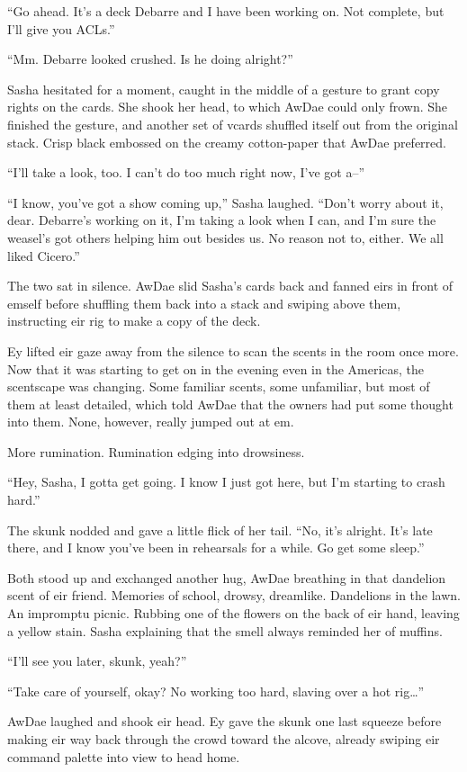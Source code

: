 ``Go ahead. It's a deck Debarre and I have been working on. Not complete, but I'll give you ACLs.''

``Mm. Debarre looked crushed. Is he doing alright?''

Sasha hesitated for a moment, caught in the middle of a gesture to grant copy rights on the cards. She shook her head, to which AwDae could only frown. She finished the gesture, and another set of vcards shuffled itself out from the original stack. Crisp black embossed on the creamy cotton-paper that AwDae preferred.

``I'll take a look, too. I can't do too much right now, I've got a--''

``I know, you've got a show coming up,'' Sasha laughed. ``Don't worry about it, dear. Debarre's working on it, I'm taking a look when I can, and I'm sure the weasel's got others helping him out besides us. No reason not to, either. We all liked Cicero.''

The two sat in silence. AwDae slid Sasha's cards back and fanned eirs in front of emself before shuffling them back into a stack and swiping above them, instructing eir rig to make a copy of the deck.

Ey lifted eir gaze away from the silence to scan the scents in the room once more. Now that it was starting to get on in the evening even in the Americas, the scentscape was changing. Some familiar scents, some unfamiliar, but most of them at least detailed, which told AwDae that the owners had put some thought into them. None, however, really jumped out at em.

More rumination. Rumination edging into drowsiness.

``Hey, Sasha, I gotta get going. I know I just got here, but I'm starting to crash hard.''

The skunk nodded and gave a little flick of her tail. ``No, it's alright. It's late there, and I know you've been in rehearsals for a while. Go get some sleep.''

Both stood up and exchanged another hug, AwDae breathing in that dandelion scent of eir friend. Memories of school, drowsy, dreamlike. Dandelions in the lawn. An impromptu picnic. Rubbing one of the flowers on the back of eir hand, leaving a yellow stain. Sasha explaining that the smell always reminded her of muffins.

``I'll see you later, skunk, yeah?''

``Take care of yourself, okay? No working too hard, slaving over a hot rig\ldots{}''

AwDae laughed and shook eir head. Ey gave the skunk one last squeeze before making eir way back through the crowd toward the alcove, already swiping eir command palette into view to head home.
